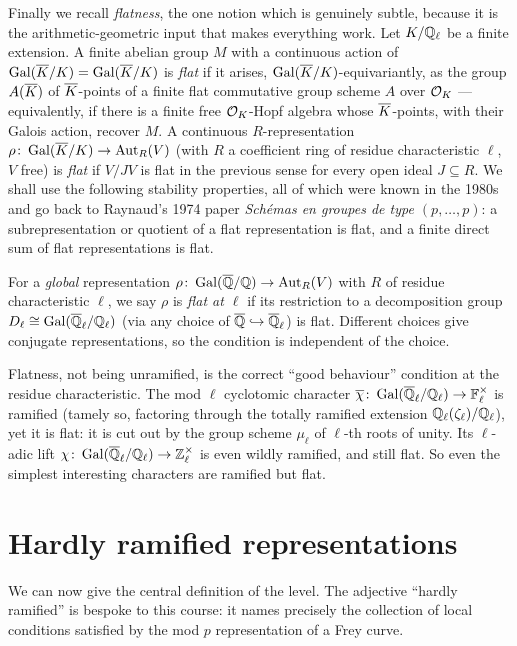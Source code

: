 \documentclass[11pt]{article}
\begin{document}
Finally we recall \emph{flatness}, the one notion which is genuinely subtle,
because it is the arithmetic-geometric input that makes everything work. Let
$K/\mathbb{Q}_\ell$ be a finite extension. A finite abelian group $M$ with a continuous
action of $\operatorname{Gal}(\overline{K}/K)=\operatorname{Gal}(\overline{K}/K)$ is \emph{flat} if it arises, $\operatorname{Gal}(\overline{K}/K)$-equivariantly,
as the group $A(\overline{K})$ of $\overline{K}$-points of a finite flat commutative group
scheme $A$ over $\mathcal{O}_K$ --- equivalently, if there is a finite free
$\mathcal{O}_K$-Hopf algebra whose $\overline{K}$-points, with their Galois action, recover
$M$. A continuous $R$-representation $\rho\colon\operatorname{Gal}(\overline{K}/K)\to\operatorname{Aut}_R(V)$ (with $R$ a
coefficient ring of residue characteristic $\ell$, $V$ free) is \emph{flat} if
$V/JV$ is flat in the previous sense for every open ideal $J\subseteq R$. We
shall use the following stability properties, all of which were known in the
1980s and go back to Raynaud's 1974 paper \emph{Sch\'emas en groupes de type
$(p,\dots,p)$}: a subrepresentation or quotient of a flat representation is
flat, and a finite direct sum of flat representations is flat.

For a \emph{global} representation $\rho\colon\operatorname{Gal}(\overline{\mathbb{Q}}/\mathbb{Q})\to\operatorname{Aut}_R(V)$ with $R$ of
residue characteristic $\ell$, we say $\rho$ is \emph{flat at $\ell$} if its
restriction to a decomposition group $D_\ell\cong\operatorname{Gal}(\overline{\mathbb{Q}}_\ell/\mathbb{Q}_\ell)$ (via any choice of
$\overline{\mathbb{Q}}\hookrightarrow\overline{\mathbb{Q}}_\ell$) is flat. Different choices give conjugate
representations, so the condition is independent of the choice.

\begin{remark}
Flatness, not being unramified, is the correct ``good behaviour'' condition at
the residue characteristic. The mod $\ell$ cyclotomic character
$\overline{\chi}\colon\operatorname{Gal}(\overline{\mathbb{Q}}_\ell/\mathbb{Q}_\ell)\to\mathbb{F}_\ell^\times$ is ramified (tamely so, factoring through the
totally ramified extension $\mathbb{Q}_\ell(\zeta_\ell)/\mathbb{Q}_\ell$), yet it is flat: it is cut
out by the group scheme $\mu_\ell$ of $\ell$-th roots of unity. Its $\ell$-adic
lift $\chi\colon\operatorname{Gal}(\overline{\mathbb{Q}}_\ell/\mathbb{Q}_\ell)\to\mathbb{Z}_\ell^\times$ is even wildly ramified, and still flat. So
even the simplest interesting characters are ramified but flat.
\end{remark}

\section{Hardly ramified representations}

We can now give the central definition of the level. The adjective ``hardly
ramified'' is bespoke to this course: it names precisely the collection of
local conditions satisfied by the mod $p$ representation of a Frey curve.
\end{document}
